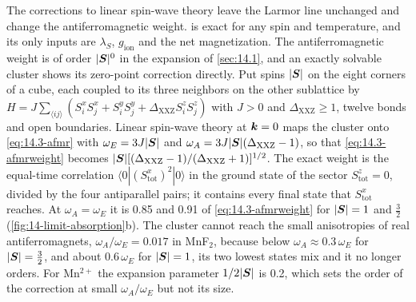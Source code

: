 The corrections to linear spin-wave theory leave the Larmor line unchanged and change the antiferromagnetic weight.  is exact for any spin and temperature, and its only inputs are $\lambda_S$, $g_{\mathrm{ion}}$ and the net magnetization. The antiferromagnetic weight is of order $|\bm{S}|^0$ in the expansion of \cref{sec:14.1}, and an exactly solvable cluster shows its zero-point correction directly. Put spins $|\bm{S}|$ on the eight corners of a cube, each coupled to its three neighbors on the other sublattice by $H = J\sum_{\langle ij\rangle}(S^x_iS^x_j + S^y_iS^y_j + \Delta_{\mathrm{XXZ}}S^z_iS^z_j)$ with $J > 0$ and $\Delta_{\mathrm{XXZ}} \ge 1$, twelve bonds and open boundaries. Linear spin-wave theory at $\bm{k} = 0$ maps the cluster onto \cref{eq:14.3-afmr} with $\omega_E = 3J|\bm{S}|$ and $\omega_A = 3J|\bm{S}|(\Delta_{\mathrm{XXZ}} - 1)$, so that \cref{eq:14.3-afmrweight} becomes $|\bm{S}|[(\Delta_{\mathrm{XXZ}} - 1)/(\Delta_{\mathrm{XXZ}} + 1)]^{1/2}$. The exact weight is the equal-time correlation $\langle0|(S^x_{\mathrm{tot}})^2|0\rangle$ in the ground state of the sector $S^z_{\mathrm{tot}} = 0$, divided by the four antiparallel pairs; it contains every final state that $S^x_{\mathrm{tot}}$ reaches. At $\omega_A = \omega_E$ it is 0.85 and 0.91 of \cref{eq:14.3-afmrweight} for $|\bm{S}| = 1$ and $\frac32$ (\cref{fig:14-limit-absorption}b). The cluster cannot reach the small anisotropies of real antiferromagnets, $\omega_A/\omega_E = 0.017$ in MnF$_2$, because below $\omega_A \approx 0.3\,\omega_E$ for $|\bm{S}| = \frac32$, and about $0.6\,\omega_E$ for $|\bm{S}| = 1$, its two lowest states mix and it no longer orders. For Mn$^{2+}$ the expansion parameter $1/2|\bm{S}|$ is 0.2, which sets the order of the correction at small $\omega_A/\omega_E$ but not its size.
